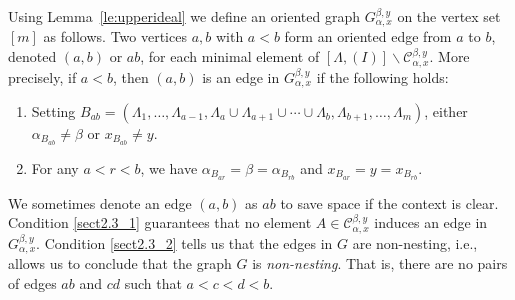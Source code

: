 \documentclass[10pt]{amsart}
\theoremstyle{definition}
\begin{document}
Using Lemma~\ref{le:upperideal} we define an oriented graph $G_{\alpha,x}^{\beta,y}$ on the vertex set $[m]$ as follows. Two vertices $a,b$ with $a<b$ form an oriented edge from $a$ to $b$, denoted $(a,b)$ or $ab$, for each minimal element of $[\Lambda,(I)]\backslash \mathcal{C}_{\alpha,x}^{\beta,y}$. 
More precisely, if $a<b$, then $(a,b)$ is an edge in $ G_{\alpha,x}^{\beta,y}$ if the following holds:
\begin{enumerate}
 \item %
\label{sect2.3_1} Setting $B_{ab}=(\Lambda_1,\ldots,\Lambda_{a-1},\Lambda_a\cup\Lambda_{a+1}\cup {}\cdots{}\cup \Lambda_b,\Lambda_{b+1},\ldots,\Lambda_m)$, either
 $ \alpha_{B_{ab}}\ne \beta$ or $x_{B_{ab}}\ne y.$
 \item %
\label{sect2.3_2}For any $a<r<b$, we have $ \alpha_{B_{ar}}= \beta=\alpha_{B_{rb}}$ and $x_{B_{ar}}= y=x_{B_{rb}}.$
\end{enumerate}
We sometimes denote an edge $(a,b)$ as $ab$ to save space if the context is clear.
Condition \eqref{sect2.3_1} guarantees that no element $A\in\mathcal{C}_{\alpha,x}^{\beta,y}$ induces an edge in $G_{\alpha,x}^{\beta,y}$. Condition \eqref{sect2.3_2} tells us that the edges in $G$ are non-nesting, i.e., 
allows us to conclude that the graph $G$ is \emph{non-nesting}. That is, there are no pairs of edges $ab$ and $cd$ such that $a<c<d< b$. 
\end{document}
